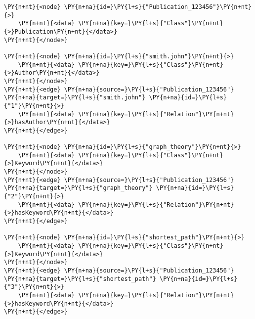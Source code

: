 \begin{Verbatim}[commandchars=\\\{\}, fontsize=\footnotesize, frame=single]
\PY{n+nt}{<node} \PY{n+na}{id=}\PY{l+s}{"Publication_123456"}\PY{n+nt}{>}
    \PY{n+nt}{<data} \PY{n+na}{key=}\PY{l+s}{"Class"}\PY{n+nt}{>}Publication\PY{n+nt}{</data>}
\PY{n+nt}{</node>}

\PY{n+nt}{<node} \PY{n+na}{id=}\PY{l+s}{"smith.john"}\PY{n+nt}{>}
    \PY{n+nt}{<data} \PY{n+na}{key=}\PY{l+s}{"Class"}\PY{n+nt}{>}Author\PY{n+nt}{</data>}
\PY{n+nt}{</node>}
\PY{n+nt}{<edge} \PY{n+na}{source=}\PY{l+s}{"Publication_123456"} \PY{n+na}{target=}\PY{l+s}{"smith.john"} \PY{n+na}{id=}\PY{l+s}{"1"}\PY{n+nt}{>}
    \PY{n+nt}{<data} \PY{n+na}{key=}\PY{l+s}{"Relation"}\PY{n+nt}{>}hasAuthor\PY{n+nt}{</data>}
\PY{n+nt}{</edge>}

\PY{n+nt}{<node} \PY{n+na}{id=}\PY{l+s}{"graph_theory"}\PY{n+nt}{>}
    \PY{n+nt}{<data} \PY{n+na}{key=}\PY{l+s}{"Class"}\PY{n+nt}{>}Keyword\PY{n+nt}{</data>}
\PY{n+nt}{</node>}
\PY{n+nt}{<edge} \PY{n+na}{source=}\PY{l+s}{"Publication_123456"} \PY{n+na}{target=}\PY{l+s}{"graph_theory"} \PY{n+na}{id=}\PY{l+s}{"2"}\PY{n+nt}{>}
    \PY{n+nt}{<data} \PY{n+na}{key=}\PY{l+s}{"Relation"}\PY{n+nt}{>}hasKeyword\PY{n+nt}{</data>}
\PY{n+nt}{</edge>}

\PY{n+nt}{<node} \PY{n+na}{id=}\PY{l+s}{"shortest_path"}\PY{n+nt}{>}
    \PY{n+nt}{<data} \PY{n+na}{key=}\PY{l+s}{"Class"}\PY{n+nt}{>}Keyword\PY{n+nt}{</data>}
\PY{n+nt}{</node>}
\PY{n+nt}{<edge} \PY{n+na}{source=}\PY{l+s}{"Publication_123456"} \PY{n+na}{target=}\PY{l+s}{"shortest_path"} \PY{n+na}{id=}\PY{l+s}{"3"}\PY{n+nt}{>}
    \PY{n+nt}{<data} \PY{n+na}{key=}\PY{l+s}{"Relation"}\PY{n+nt}{>}hasKeyword\PY{n+nt}{</data>}
\PY{n+nt}{</edge>}

\end{Verbatim}


